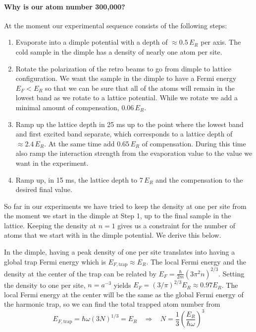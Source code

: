 \documentclass[11pt,letter]{article}
\begin{document}
\paragraph{Why is our atom number 300,000?}   At the moment our
experimental sequence consists of the following steps:
\begin{enumerate}
\item  Evaporate into a dimple potential with a depth of $\approx 0.5\,E_{R}$
per axis.   The cold sample in the dimple has a density of nearly one atom
per site.  

\item  Rotate the polarization of the retro beams to go from dimple to lattice
configuration.   We want the sample in the dimple to have a Fermi energy $E_{F}
< E_{R}$ so that we can be sure that all of the atoms will remain in the lowest
band  as we rotate to a lattice potential.   While we rotate we add a minimal
amount of compensation, 0.06\,$E_{R}$.  

\item  Ramp up the lattice depth in 25 ms up to the point where the lowest band
and first excited band separate, which corresponds to a lattice depth of
$\approx 2.4\,E_{R}$.  At the same time add 0.65\,$E_{R}$ of compensation.
During this time also ramp the interaction strength from the evaporation value
to the value we want in the experiment.  

\item Ramp up, in 15 ms,  the lattice depth to 7\,$E_{R}$ and the compensation
to the desired final value.
\end{enumerate}

So far in our experiments we have tried to keep the density at one per site
from the moment we start in the dimple at Step 1, up to the final sample in
the lattice.    Keeping the density at $n=1$ gives us a constraint for the
number of atoms that we start with in the dimple potential.   We derive this
below. 

In the dimple, having a peak density of one per site translates into having a
global trap Fermi energy which is $E_{F,\text{trap}} \approx E_{R}$.   The
local Fermi energy and the density at the center of the trap can be related by
$E_{F} = \frac{\hbar}{2m} ( 3\pi^{2} n)^{2/3}$.  Setting the density to one per
site, $n=a^{-3}$ yields  $E_{F} = (3/\pi)^{2/3} E_{R} \approx 0.97 E_{R}$.
The local Fermi energy at the center will be the same as the global Fermi
energy of the harmonic trap, so we can find the total trapped atom number from 
\begin{equation}
  E_{F,\text{trap}} = \hbar \omega ( 3 N )^{1/3}  = E_{R}  
 \ \ \ \  \Rightarrow  \ \ \ \  N = \frac{1}{3} 
  \left( \frac{ E_{R}} {\hbar \omega} \right)^{3} 
\end{equation} 
\end{document}

